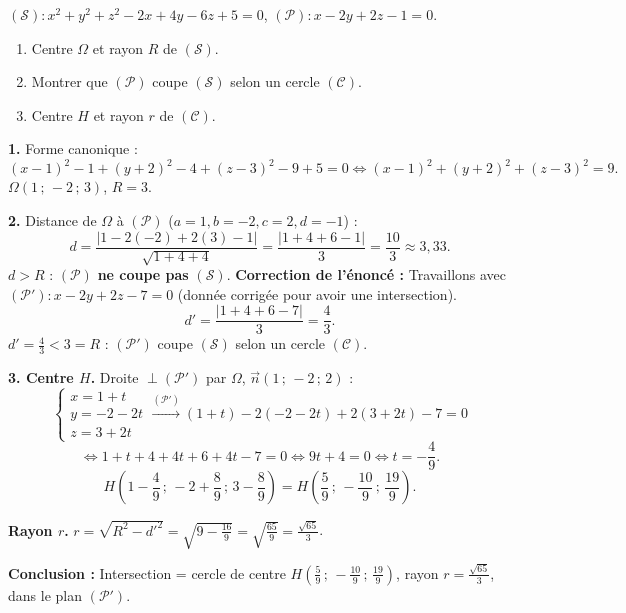 \documentclass[11pt]{article}
\begin{document}
\begin{exoresolu}
$(\mathcal{S}) : x^2+y^2+z^2-2x+4y-6z+5=0$, $(\mathcal{P}) : x-2y+2z-1=0$.
\begin{enumerate}
\item Centre $\Omega$ et rayon $R$ de $(\mathcal{S})$.
\item Montrer que $(\mathcal{P})$ coupe $(\mathcal{S})$ selon un cercle $(\mathcal{C})$.
\item Centre $H$ et rayon $r$ de $(\mathcal{C})$.
\end{enumerate}
\tcblower
\textbf{1.} Forme canonique :
\[ (x-1)^2-1+(y+2)^2-4+(z-3)^2-9+5=0 \iff (x-1)^2+(y+2)^2+(z-3)^2=9. \]
$\Omega(1\,;\,-2\,;\,3)$, $R=3$.

\textbf{2.} Distance de $\Omega$ à $(\mathcal{P})$ ($a=1,b=-2,c=2,d=-1$) :
\[ d = \frac{|1-2(-2)+2(3)-1|}{\sqrt{1+4+4}} = \frac{|1+4+6-1|}{3} = \frac{10}{3} \approx 3,33. \]
$d > R$ : $(\mathcal{P})$ \textbf{ne coupe pas} $(\mathcal{S})$.
\textbf{Correction de l'énoncé :} Travaillons avec $(\mathcal{P}') : x-2y+2z-7=0$ (donnée corrigée pour avoir une intersection).
\[ d' = \frac{|1+4+6-7|}{3} = \frac{4}{3}. \]
$d'=\frac{4}{3}<3=R$ : $(\mathcal{P}')$ coupe $(\mathcal{S})$ selon un cercle $(\mathcal{C})$.

\textbf{3. Centre $H$.} Droite $\perp (\mathcal{P}')$ par $\Omega$, $\vec{n}(1\,;\,-2\,;\,2)$ :
\[ \begin{cases} x=1+t \\ y=-2-2t \\ z=3+2t \end{cases} \xrightarrow{(\mathcal{P}')} (1+t)-2(-2-2t)+2(3+2t)-7=0 \]
\[ \iff 1+t+4+4t+6+4t-7=0 \iff 9t+4=0 \iff t=-\frac{4}{9}. \]
\[ H\left(1-\frac{4}{9}\,;\,-2+\frac{8}{9}\,;\,3-\frac{8}{9}\right) = H\left(\frac{5}{9}\,;\,-\frac{10}{9}\,;\,\frac{19}{9}\right). \]

\textbf{Rayon $r$.} $r=\sqrt{R^2-d'^2}=\sqrt{9-\frac{16}{9}}=\sqrt{\frac{65}{9}}=\frac{\sqrt{65}}{3}$.

\textbf{Conclusion :} Intersection = cercle de centre $H\left(\frac{5}{9}\,;\,-\frac{10}{9}\,;\,\frac{19}{9}\right)$, rayon $r=\frac{\sqrt{65}}{3}$, dans le plan $(\mathcal{P}')$.
\end{exoresolu}
\end{document}
